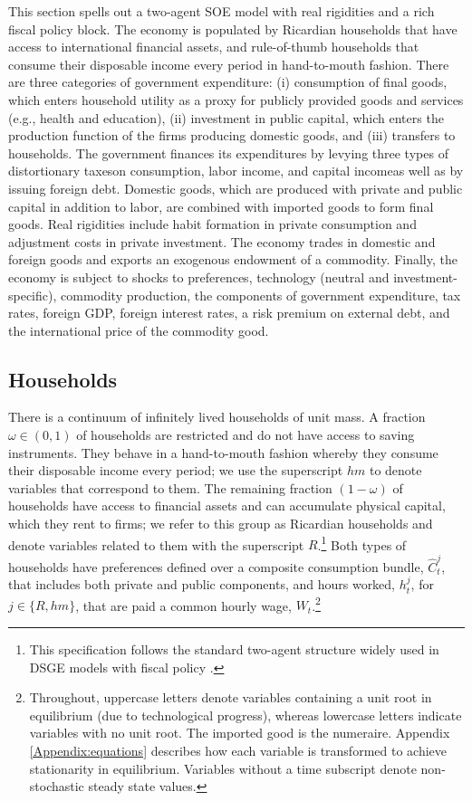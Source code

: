 \documentclass[12pt]{article}
\begin{document}
This section spells out a two-agent SOE model with real rigidities and a rich fiscal policy block. The economy is populated by Ricardian households that have access to international financial assets, and rule-of-thumb households that consume their disposable income every period in hand-to-mouth fashion. There are three categories of government expenditure: (i) consumption of final goods, which enters household utility as a proxy for publicly provided goods and services (e.g., health and education), (ii) investment in public capital, which enters the production function of the firms producing domestic goods, and (iii) transfers to households. The government finances its expenditures by levying three types of distortionary taxes\textemdash on consumption, labor income, and capital income\textemdash as well as by issuing foreign debt. Domestic goods, which are produced with private and public capital in addition to labor, are combined with imported goods to form final goods. Real rigidities include habit formation in private consumption and adjustment costs in private investment. The economy trades in domestic and foreign goods and exports an exogenous endowment of a commodity. Finally, the economy is subject to shocks to preferences, technology (neutral and investment-specific), commodity production, the components of government expenditure, tax rates, foreign GDP, foreign interest rates, a risk premium on external debt, and the international price of the commodity good.

{\normalsize \label{sec:model}}

\subsection{Households}

There is a continuum of infinitely lived households of unit mass. A fraction $\omega\in (0,1)$ of households are restricted and do not have access to saving instruments. They behave in a hand-to-mouth fashion whereby they consume their disposable income every period; we use the superscript $hm$ to denote variables that correspond to them. The remaining fraction $(1-\omega)$ of households have access to financial assets and can accumulate physical capital, which they rent to firms; we refer to this group as Ricardian households and denote variables related to them with the superscript $R$.\footnote{This specification follows the standard two-agent structure widely used in DSGE models with fiscal policy \citep[e.g.][]{coenen2005does, gali2007understanding}.} Both types of households have preferences defined over a composite consumption bundle, $\hat{C}^j_{t}$, that includes both private and public components, and hours worked, $h^j_{t}$, for $j\in\{R,hm\}$, that are paid a common hourly wage, $W_t$.\footnote{Throughout, uppercase letters denote variables containing a unit root in equilibrium (due to technological progress), whereas lowercase letters indicate variables with no unit root. The imported good is the numeraire. Appendix \ref{Appendix:equations} describes how each variable is transformed to achieve stationarity in equilibrium. Variables without a time subscript denote non-stochastic steady state values.}
\end{document}

